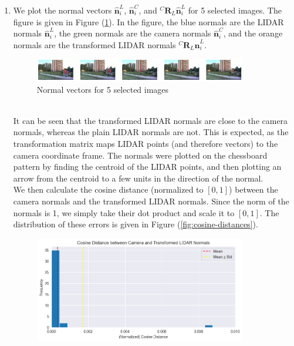 \documentclass[10pt]{article}
\newcommand{\figref}[1]{Figure (\ref{fig:#1})}
\begin{document}
\begin{enumerate}
        \item We plot the normal vectors $\mathbf{\hat{n}}_{i}^{L}$, $\mathbf{\hat{n}}_{i}^{C}$,
        and $^{C} \mathbf{R}_{L} \mathbf{\hat{n}}_{i}^{L}$ for 5 selected images. The
        figure is given in \figref{normals-lidar}. In the figure, the blue normals are
        the LIDAR normals $\mathbf{\hat{n}}_{i}^{L}$, the green normals are the camera
        normals $\mathbf{\hat{n}}_{i}^{C}$, and the orange normals are the transformed
        LIDAR normals $^{C} \mathbf{R}_{L} \mathbf{\hat{n}}_{i}^{L}$.
        \begin{figure}[htbp]
            \begin{center}
                \includegraphics[width=0.875\textwidth]{Assets/Question-5/normals.png}
                \caption{Normal vectors for 5 selected images}
                \label{fig:normals-lidar}
            \end{center}
        \end{figure}
        \vspace*{0pt} \\
        It can be seen that the transformed LIDAR normals are close to the camera normals,
        whereas the plain LIDAR normals are not. This is expected, as the transformation
        matrix maps LIDAR points (and therefore vectors) to the camera coordinate frame.
        The normals were plotted on the chessboard pattern by finding the centroid of the
        LIDAR points, and then plotting an arrow from the centroid to a few units in the
        direction of the normal. \\
        We then calculate the cosine distance (normalized to $[0, 1]$) between the camera
        normals and the transformed LIDAR normals. Since the norm of the normals is 1, we
        simply take their dot product and scale it to $[0, 1]$. The distribution of these
        errors is given in \figref{cosine-distances}.
        \begin{figure}[htbp]
            \begin{center}
                \includegraphics[width=0.875\textwidth]{Assets/Question-5/cosine-distances.png}

\end{center}
\end{figure}
\end{enumerate}
\end{document}
